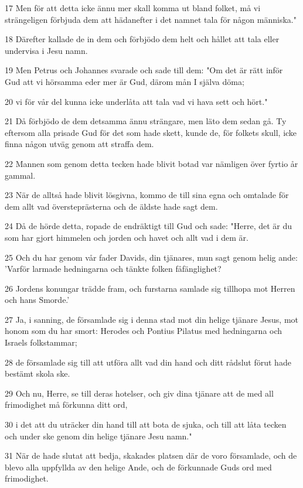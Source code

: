 \par 17 Men för att detta icke ännu mer skall komma ut bland folket, må vi strängeligen förbjuda dem att hädanefter i det namnet tala för någon människa."
\par 18 Därefter kallade de in dem och förbjödo dem helt och hållet att tala eller undervisa i Jesu namn.
\par 19 Men Petrus och Johannes svarade och sade till dem: "Om det är rätt inför Gud att vi hörsamma eder mer är Gud, därom mån I själva döma;
\par 20 vi för vår del kunna icke underlåta att tala vad vi hava sett och hört."
\par 21 Då förbjödo de dem detsamma ännu strängare, men läto dem sedan gå. Ty eftersom alla prisade Gud för det som hade skett, kunde de, för folkets skull, icke finna någon utväg genom att straffa dem.
\par 22 Mannen som genom detta tecken hade blivit botad var nämligen över fyrtio år gammal.
\par 23 När de alltså hade blivit lösgivna, kommo de till sina egna och omtalade för dem allt vad översteprästerna och de äldste hade sagt dem.
\par 24 Då de hörde detta, ropade de endräktigt till Gud och sade: "Herre, det är du som har gjort himmelen och jorden och havet och allt vad i dem är.
\par 25 Och du har genom vår fader Davids, din tjänares, mun sagt genom helig ande: 'Varför larmade hedningarna och tänkte folken fåfänglighet?
\par 26 Jordens konungar trädde fram, och furstarna samlade sig tillhopa mot Herren och hans Smorde.'
\par 27 Ja, i sanning, de församlade sig i denna stad mot din helige tjänare Jesus, mot honom som du har smort: Herodes och Pontius Pilatus med hedningarna och Israels folkstammar;
\par 28 de församlade sig till att utföra allt vad din hand och ditt rådslut förut hade bestämt skola ske.
\par 29 Och nu, Herre, se till deras hotelser, och giv dina tjänare att de med all frimodighet må förkunna ditt ord,
\par 30 i det att du uträcker din hand till att bota de sjuka, och till att låta tecken och under ske genom din helige tjänare Jesu namn."
\par 31 När de hade slutat att bedja, skakades platsen där de voro församlade, och de blevo alla uppfyllda av den helige Ande, och de förkunnade Guds ord med frimodighet.
